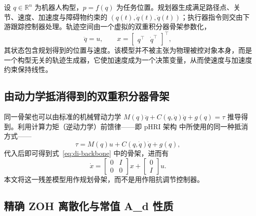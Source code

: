 设 \(q\in\mathbb{R}^n\) 为机器人构型，\(p=f(q)\) 为任务位置。规划器生成满足路径点、关节、速度、加速度与障碍物约束的 \((q(t),\dot q(t),\ddot q(t))\)；执行器指令则交由下游跟踪控制器处理。轨迹空间由一个虚拟的双重积分器骨架参数化，
\begin{equation}
\label{eq:di-backbone}
  \ddot q = u,\qquad
  x=\begin{bmatrix}q^\top&\dot q^\top\end{bmatrix}^\top ,
\end{equation}
其状态包含规划得到的位置与速度。该模型并不被主张为物理被控对象本身，而是一个构型无关的轨迹生成器，它使加速度成为一个决策变量，从而使速度与加速度约束保持线性。

\subsection{由动力学抵消得到的双重积分器骨架}\label{a.-double-integrator-backbone-from-dynamic-cancellation}

同一骨架也可以由标准的机械臂动力学 \(M(q)\ddot q+C(q,\dot q)\dot q+g(q)=\tau\) 推导得到。利用计算力矩（逆动力学）前馈律——即 pHRI 架构 \cite{phri} 中所使用的同一种抵消方式——
\begin{equation}
\label{eq:computed-torque}
  \tau = M(q)u + C(q,\dot q)\dot q + g(q),
\end{equation}
代入后即可得到式~\eqref{eq:di-backbone} 中的骨架，进而有
\begin{equation}
\label{eq:residual-dynamics}
\dot x = \begin{bmatrix} 0&I\\ 0&0 \end{bmatrix}x +
\begin{bmatrix} 0\\ I \end{bmatrix}u .
\end{equation}
本文将这一残差模型用作规划骨架，而不是用作阻抗调节控制器。

\subsection{精确 ZOH 离散化与常值 A\_d 性质}\label{b.-exact-zoh-discretization-and-the-constant-a_d-property}

